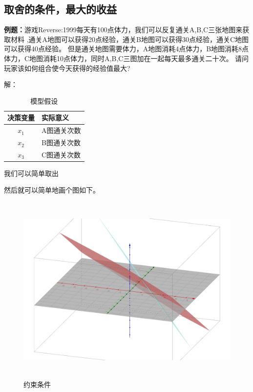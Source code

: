 \documentclass[a4paper,20pt]{article}
\begin{document}
\subsection{取舍的条件，最大的收益}
\par \textbf{例题：}游戏Reverse:1999每天有100点体力，我们可以反复通关A,B,C三张地图来获取材料
,通关A地图可以获得20点经验，通关B地图可以获得30点经验，通关C地图可以获得40点经验。
但是通关地图需要体力，A地图消耗4点体力，B地图消耗8点体力，C地图消耗10点体力，同时A,B,C三图加在一起每天最多通关二十次。
请问玩家该如何组合使今天获得的经验值最大?
\par \small{解：}
\begin{table}[H]
        
    \caption{模型假设}
    \centering
    \begin{tabular}{ c l }
    \hline
    决策变量 & 实际意义 \\
    \hline
    $x_1$ & A图通关次数\\
    \hline
    $x_2$ & B图通关次数\\
    \hline
    $x_3$ & C图通关次数\\
    \hline
    \end{tabular}
\end{table}
我们可以简单取出  \par   {}
然后就可以简单地画个图如下。
\begin{figure}[H]
    \centering
    \includegraphics[width=340pt,height=270pt]{figure1.png}
    \caption{约束条件}
\end{figure}
\end{document}
